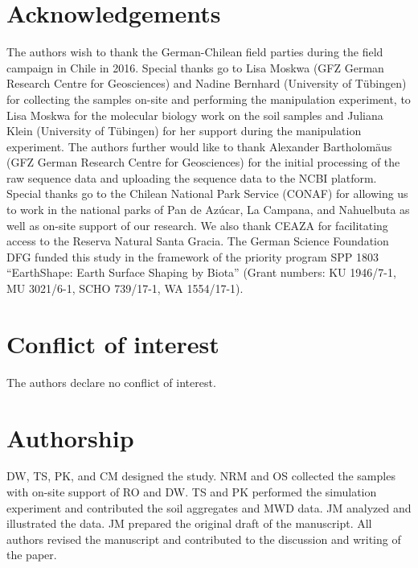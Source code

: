 \section*{Acknowledgements}

The authors wish to thank the German-Chilean field parties during the field campaign in Chile in 2016. Special thanks go to Lisa Moskwa (GFZ German Research Centre for Geosciences) and Nadine Bernhard (University of T{\"u}bingen) for collecting the samples on-site and performing the manipulation experiment, to Lisa Moskwa for the molecular biology work on the soil samples and Juliana Klein (University of T{\"u}bingen) for her support during the manipulation experiment. The authors further would like to thank Alexander Bartholom{\"a}us (GFZ German Research Centre for Geosciences) for the initial processing of the raw sequence data and uploading the sequence data to the NCBI platform. Special thanks go to the Chilean National Park Service (CONAF) for allowing us to work in the national parks of Pan de Az{\'u}car, La Campana, and Nahuelbuta as well as on-site support of our research. We also thank CEAZA for facilitating access to the Reserva Natural Santa Gracia. The German Science Foundation DFG funded this study in the framework of the priority program SPP 1803 ``EarthShape: Earth Surface Shaping by Biota'' (Grant numbers: KU 1946/7-1, MU 3021/6-1, SCHO 739/17-1, WA 1554/17-1).

\section*{Conflict of interest}

The authors declare no conflict of interest.

\section*{Authorship}

DW, TS, PK, and CM designed the study. NRM and OS collected the samples with on-site support of RO and DW. TS and PK performed the simulation experiment and contributed the soil aggregates and MWD data. JM analyzed and illustrated the data. JM prepared the original draft of the manuscript. All authors revised the manuscript and contributed to the discussion and writing of the paper.
